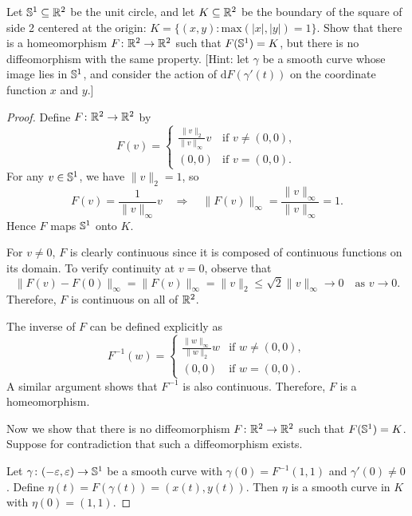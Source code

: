 \begin{problem}
    Let $\mathbb{S}^1 \subseteq \mathbb{R}^2$ be the unit circle, and let $K \subseteq \mathbb{R}^2$ be the boundary of the square of side 2 centered at the origin: $K = \{(x,y) \colon \mathrm{max}(|x|, |y|)=1\}$. Show that there is a homeomorphism $F \colon \mathbb{R}^2 \to \mathbb{R}^2$ such that $F(\mathbb{S}^1) = K$, but there is no diffeomorphism with the same property. [Hint: let $\gamma$ be a smooth curve whose image lies in $\mathbb{S}^1$, and consider the action of $\mathrm{d}F(\gamma'(t))$ on the coordinate function $x$ and $y$.]
    \begin{proof}
        Define $F \colon \mathbb{R}^2 \to \mathbb{R}^2$ by
        \[
        F(v) = 
        \begin{cases}
            \displaystyle \frac{\|v\|_2}{\|v\|_\infty} v & \text{if } v \neq (0,0), \\
            (0,0) & \text{if } v = (0,0).
        \end{cases}
        \]
        For any $v \in \mathbb{S}^1$, we have $\|v\|_2 = 1$, so
        \[
        F(v) = \frac{1}{\|v\|_\infty} v \quad \Rightarrow \quad \|F(v)\|_\infty = \frac{\|v\|_\infty}{\|v\|_\infty} = 1.
        \]
        Hence $F$ maps $\mathbb{S}^1$ onto $K$.

        For $v \neq 0$, $F$ is clearly continuous since it is composed of continuous functions on its domain. To verify continuity at $v = 0$, observe that
        \[
        \|F(v) - F(0)\|_\infty = \|F(v)\|_\infty = \|v\|_2 \le \sqrt{2} \|v\|_\infty \to 0 \quad \text{as } v \to 0.
        \]
        Therefore, $F$ is continuous on all of $\mathbb{R}^2$.

        The inverse of $F$ can be defined explicitly as
        \[
        F^{-1}(w) = 
        \begin{cases}
            \displaystyle \frac{\|w\|_\infty}{\|w\|_2} w & \text{if } w \neq (0,0), \\
            (0,0) & \text{if } w = (0,0).
        \end{cases}
        \]
        A similar argument shows that $F^{-1}$ is also continuous. Therefore, $F$ is a homeomorphism.

        Now we show that there is no diffeomorphism $F \colon \mathbb{R}^2 \to \mathbb{R}^2$ such that $F(\mathbb{S}^1) = K$. Suppose for contradiction that such a diffeomorphism exists.

        Let $\gamma \colon (-\varepsilon, \varepsilon) \to \mathbb{S}^1$ be a smooth curve with $\gamma(0) = F^{-1}(1,1)$ and $\gamma'(0) \ne 0$. Define $\eta(t) = F(\gamma(t)) = (x(t), y(t))$. Then $\eta$ is a smooth curve in $K$ with $\eta(0) = (1,1)$.


\end{proof}
\end{problem}
